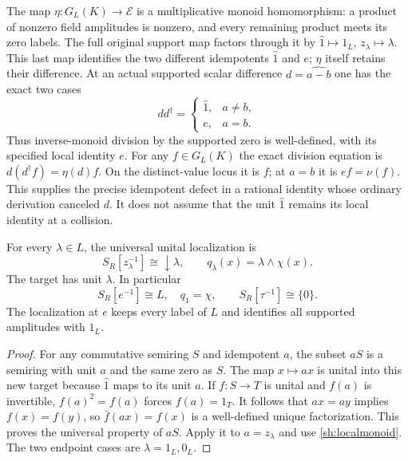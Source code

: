The map $\eta:G_L(K)\to\mathcal E$ is a multiplicative
monoid homomorphism: a product of nonzero field amplitudes
is nonzero, and every remaining product meets its zero labels.
The full original support map factors through it by
$\widehat1\mapsto1_L$, $z_\lambda\mapsto\lambda$.
This last map identifies the two different idempotents
$\widehat1$ and $e$; $\eta$ itself retains their difference.
At an actual supported scalar difference $d=\widehat{a-b}$
one has the exact two cases
\begin{equation}\tag{SH6c}\label{sh:collisionunit}
 dd^\dagger=
 \begin{cases}
 \widehat1,&a\ne b,\\
 e,&a=b.
 \end{cases}
\end{equation}
Thus inverse-monoid division by the supported zero is
well-defined, with its specified local identity $e$.
For any $f\in G_L(K)$ the exact division equation is
$d(d^\dagger f)=\eta(d)f$. On the distinct-value locus
it is $f$; at $a=b$ it is $ef=\nu(f)$.
This supplies the precise idempotent defect in a rational
identity whose ordinary derivation canceled $d$. It does
not assume that the unit $\widehat1$ remains its local
identity at a collision.

\begin{theorem}\label{sh:localization}
For every $\lambda\in L$, the universal unital localization is
\begin{equation}\tag{SH7}\label{sh:localize}
 S_R[z_\lambda^{-1}]\cong\downarrow\lambda,\qquad
 q_\lambda(x)=\lambda\wedge\chi(x).
\end{equation}
The target has unit $\lambda$. In particular
\begin{equation}\tag{SH8}\label{sh:elocalize}
 S_R[e^{-1}]\cong L,\quad q_1=\chi,\qquad
 S_R[\tau^{-1}]\cong\{0\}.
\end{equation}
The localization at $e$ keeps every label of $L$ and identifies
all supported amplitudes with $1_L$.
\end{theorem}
\begin{proof}
For any commutative semiring $S$ and idempotent $a$, the subset
$aS$ is a semiring with unit $a$ and the same zero as $S$.
The map $x\mapsto ax$ is unital into this new target because
$\widehat1$ maps to its unit $a$. If $f:S\to T$ is unital and
$f(a)$ is invertible, $f(a)^2=f(a)$ forces $f(a)=1_T$.
It follows that $ax=ay$ implies $f(x)=f(y)$, so
$\bar f(ax)=f(x)$ is a well-defined unique factorization.
This proves the universal property of $aS$.
Apply it to $a=z_\lambda$ and use \eqref{sh:localmonoid}.
The two endpoint cases are $\lambda=1_L,0_L$.
\end{proof}

